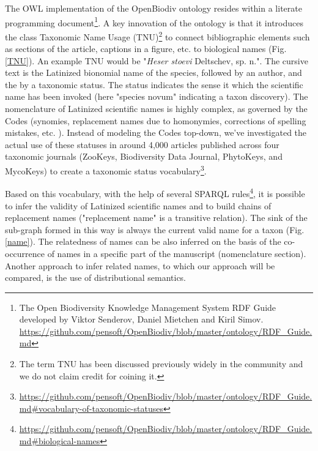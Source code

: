 \documentclass{IOS-Book-Article}
\begin{document}
The OWL implementation of the OpenBiodiv ontology resides within a literate programming document\footnote{The {Open} {Biodiversity} {Knowledge} {Management} {System} {RDF} {Guide} developed by Viktor Senderov, Daniel Mietchen and Kiril Simov. \url{https://github.com/pensoft/OpenBiodiv/blob/master/ontology/RDF\_Guide.md}}. A key innovation of the ontology is that it introduces the class Taxonomic Name Usage (TNU)\footnote{The term TNU has been discussed previously widely in the community and we do not claim credit for coining it.} to connect bibliographic elements such as sections of the article, captions in a figure, etc. to biological names (Fig. \ref{TNU}). An example TNU would be "\emph{Heser stoevi} Deltschev, sp. n.". The cursive text is the Latinized bionomial name of the species, followed by an author, and the by a taxonomic status. The status indicates the sense it which the scientific name has been invoked (here "species novum" indicating a taxon discovery). The nomenclature of Latinized scientific names is highly complex, as governed by the Codes (synomies, replacement names due to homonymies, corrections of spelling mistakes, etc. \cite{r22}). Instead of modeling the Codes top-down, we've investigated the actual use of these statuses in around 4,000 articles published across four taxonomic journals (ZooKeys, Biodiversity Data Journal, PhytoKeys, and MycoKeys) to create a taxonomic status vocabulary\footnote{\url{https://github.com/pensoft/OpenBiodiv/blob/master/ontology/RDF\_Guide.md\#vocabulary-of-taxonomic-statuses}}.

Based on this vocabulary, with the help of several SPARQL rules\footnote{\url{https://github.com/pensoft/OpenBiodiv/blob/master/ontology/RDF\_Guide.md\#biological-names}}, it is possible to infer the validity of Latinized scientific names and to build chains of replacement names ("replacement name" is a transitive relation). The sink of the sub-graph formed in this way is always the current valid name for a taxon (Fig. \ref{name}). The relatedness of names can be also inferred on the basis of the co-occurrence of names in a specific part of the manuscript (nomenclature section). Another approach to infer related names, to which our approach will be compared, is the use of distributional semantics.
\end{document}
